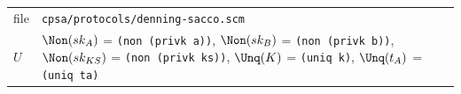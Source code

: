 \par\smallskip\noindent\begin{tabular}{@{}l p{}@{}}
file & \texttt{cpsa/protocols/denning-sacco.scm}\\
$U$ & $\Non(sk_A)$ = \texttt{(non (privk a))}, $\Non(sk_B)$ = \texttt{(non (privk b))}, $\Non(sk_{KS})$ = \texttt{(non (privk ks))}, $\Unq(K)$ = \texttt{(uniq k)}, $\Unq(t_A)$ = \texttt{(uniq ta)}\\
\end{tabular}

